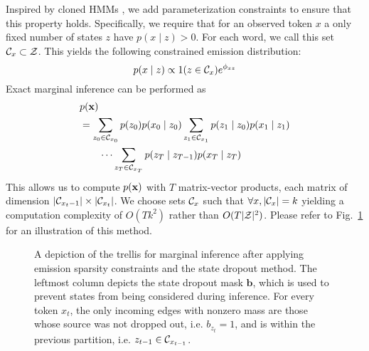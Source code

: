 \documentclass[11pt,a4paper]{article}
\begin{document}
Inspired by cloned HMMs \citep{dedieu2019learning},
we add parameterization constraints to ensure that this property holds.
Specifically, we require that for an observed token $x$
a only fixed number of states $z$ have $p(x \mid z) > 0$.
For each word, we call this set $\mathcal{C}_x \subset \mathcal{Z}$.
This yields the following constrained emission distribution:
\begin{equation}
\label{eqn:sparse_emission}
p(x \mid z) \propto 1(z \in \mathcal{C}_x)e^{\phi_{xz}}
\end{equation}
Exact marginal inference can be performed as
\begin{equation}
\label{eqn:sparse_marginalization}
\begin{aligned}
&p(\mathbf{x})\\
&= \sum_{z_0 \in \mathcal{C}_{x_0}} p(z_0)p(x_0 \mid z_0)
    \sum_{z_1 \in \mathcal{C}_{x_1}} p(z_1\mid z_0)p(x_1 \mid z_1)\\
    &\qquad\cdots
    \sum_{z_T \in \mathcal{C}_{x_T}} p(z_T \mid z_{T-1})p(x_T \mid z_T)
\end{aligned}
\end{equation}
This allows us to compute $p(\mathbf{x})$ with $T$ matrix-vector products,
each matrix of dimension $|\mathcal{C}_{x_t-1}| \times |\mathcal{C}_{x_{t}}|$.
We choose sets $\mathcal{C}_x$ such that $\forall x, |\mathcal{C}_x| = k$
yielding a computation complexity of $O(Tk^2)$ rather than $O(T|\mathcal{Z}|^2)$.
Please refer to Fig.~\ref{fig:trellis} for an illustration of this method.

\begin{figure}[!t]
\begin{center}

\end{center}
\caption{
\label{fig:trellis}
A depiction of the trellis for marginal inference
after applying emission sparsity constraints and the state dropout method.
The leftmost column depicts the state dropout mask $\mathbf{b}$,
which is used to prevent states from being considered during inference.
For every token $x_t$, the only incoming edges with nonzero mass are those
whose source was not dropped out, i.e. $b_{z_t} = 1$,
and is within the previous partition, i.e. $z_{t-1}\in\mathcal{C}_{x_{t-1}}$.
}
\end{figure}
\end{document}
